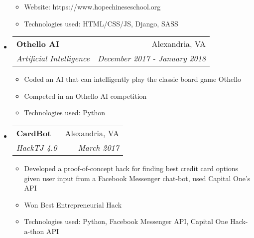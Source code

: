 \documentclass[letterpaper,11pt]{article}
\makeatletter
\newcommand{\resitem}[1]{\item #1 \vspace{-2pt}}
\newcommand{\ressubheading}[4]{
\begin{tabular*}{7.0in}{l@{\extracolsep{\fill}}r}
		\textbf{#1} & #2 \\
		\textit{#3} & \textit{#4} \\
\end{tabular*}\vspace{-6pt}}
\makeatother
\begin{document}
\begin{itemize}
\begin{itemize}
		\resitem{Website: https://www.hopechineseschool.org}
		\resitem{Technologies used: HTML/CSS/JS, Django, SASS}
	\end{itemize}
\item
    \ressubheading{Othello AI}{Alexandria, VA}{Artificial Intelligence}{December 2017 - January 2018}
    \begin{itemize}
        \resitem{Coded an AI that can intelligently play the classic board game Othello}
        \resitem{Competed in an Othello AI competition}
        \resitem{Technologies used: Python}
    \end{itemize}
\item
    \ressubheading{CardBot}{Alexandria, VA}{HackTJ 4.0}{March 2017}
    \begin{itemize}
        \resitem{Developed a proof-of-concept hack for finding best credit card options given user input from a Facebook Messenger chat-bot, used Capital One's API}
        \resitem{Won Best Entrepreneurial Hack}
        \resitem{Technologies used: Python, Facebook Messenger API, Capital One Hack-a-thon API}
    \end{itemize}
\end{itemize}

\end{document}
